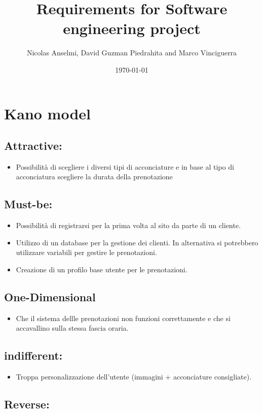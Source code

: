 \documentclass{article}
\title{Requirements for Software engineering project}
\author{Nicolas Anselmi, David Guzman Piedrahita and Marco Vinciguerra}
\date{\today}
\begin{document}
\maketitle
\section{Kano model}
\subsection{Attractive:}
\begin{itemize}
    \item Possibilità di scegliere i diversi tipi di acconciature e in 
    base al tipo di acconciatura scegliere la durata della prenotazione 
\end{itemize}
\subsection{Must-be:}
\begin{itemize}
    \item Possibilità di registrarsi per la prima volta al sito da parte di un cliente.
    \item Utilizzo di un database per la gestione dei clienti. In alternativa si potrebbero utilizzare 
    variabili per gestire le prenotazioni.
    \item Creazione di un profilo base utente per le prenotazioni.
\end{itemize}

\subsection{One-Dimensional}
\begin{itemize}
    \item Che il sistema dellle prenotazioni non funzioni correttamente 
    e che si accavallino sulla stessa fascia oraria.
\end{itemize}

\subsection{indifferent:}
\begin{itemize}
    \item Troppa personalizzazione dell'utente (immagini + acconciature consigliate).
\end{itemize}
\subsection{Reverse:}
\end{document}
